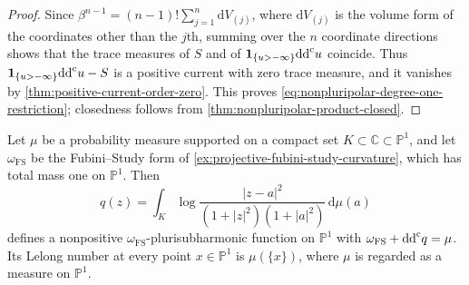 \begin{proof}
Since $\beta^{n-1}=(n-1)!\sum_{j=1}^n\mathrm dV_{(j)}$, where $\mathrm dV_{(j)}$ is the volume form of the coordinates other than the $j$th, summing over the $n$ coordinate directions shows that the trace measures of $S$ and of $\mathbf1_{\{u>-\infty\}}\mathrm{dd}^{\mathrm{c}} u$ coincide. Thus $\mathbf1_{\{u>-\infty\}}\mathrm{dd}^{\mathrm{c}} u-S$ is a positive current with zero trace measure, and it vanishes by \cref{thm:positive-current-order-zero}. This proves \eqref{eq:nonpluripolar-degree-one-restriction}; closedness follows from \cref{thm:nonpluripolar-product-closed}.
\end{proof}

\begin{proposition}\label{prop:projective-logarithmic-measure-potential}
Let $\mu$ be a probability measure supported on a compact set $K\subset\mathbb C\subset\mathbb P^1$, and let $\omega_{\mathrm{FS}}$ be the Fubini--Study form of \cref{ex:projective-fubini-study-curvature}, which has total mass one on $\mathbb P^1$. Then
\[
 q(z)=\int_K\log\frac{|z-a|^2}{(1+|z|^2)(1+|a|^2)}\,\mathrm d\mu(a)
\]
defines a nonpositive $\omega_{\mathrm{FS}}$-plurisubharmonic function on $\mathbb P^1$ with $\omega_{\mathrm{FS}}+\mathrm{dd}^{\mathrm{c}} q=\mu$. Its Lelong number at every point $x\in\mathbb P^1$ is $\mu(\{x\})$, where $\mu$ is regarded as a measure on $\mathbb P^1$.
\end{proposition}
